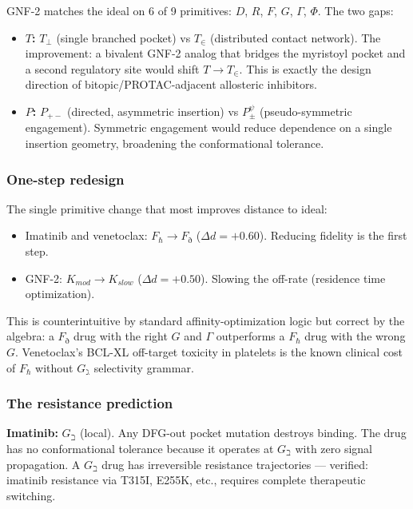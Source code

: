 \documentclass[10pt,a4paper]{article}
\begin{document}
GNF-2 matches the ideal on 6 of 9 primitives: $D$, $R$, $F$, $G$, $\Gamma$, $\Phi$. The two gaps:

\begin{itemize}
    \item \textbf{$T$:} $T_\perp$ (single branched pocket) vs $T_\in$ (distributed contact network). The improvement: a bivalent GNF-2 analog that bridges the myristoyl pocket and a second regulatory site would shift $T \to T_\in$. This is exactly the design direction of bitopic/PROTAC-adjacent allosteric inhibitors.
    \item \textbf{$P$:} $P_{+-}$ (directed, asymmetric insertion) vs $P_\pm^\psi$ (pseudo-symmetric engagement). Symmetric engagement would reduce dependence on a single insertion geometry, broadening the conformational tolerance.
\end{itemize}

\subsubsection{One-step redesign}

The single primitive change that most improves distance to ideal:

\begin{itemize}
    \item Imatinib and venetoclax: $F_\hbar \to F_\eth$ ($\Delta d = +0.60$). Reducing fidelity is the first step.
    \item GNF-2: $K_{mod} \to K_{slow}$ ($\Delta d = +0.50$). Slowing the off-rate (residence time optimization).
\end{itemize}

This is counterintuitive by standard affinity-optimization logic but correct by the algebra: a $F_\eth$ drug with the right $G$ and $\Gamma$ outperforms a $F_\hbar$ drug with the wrong $G$. Venetoclax's BCL-XL off-target toxicity in platelets is the known clinical cost of $F_\hbar$ without $G_\gimel$ selectivity grammar.

\subsubsection{The resistance prediction}

\textbf{Imatinib:} $G_\beth$ (local). Any DFG-out pocket mutation destroys binding. The drug has no conformational tolerance because it operates at $G_\beth$ with zero signal propagation. A $G_\beth$ drug has irreversible resistance trajectories --- verified: imatinib resistance via T315I, E255K, etc., requires complete therapeutic switching.
\end{document}
